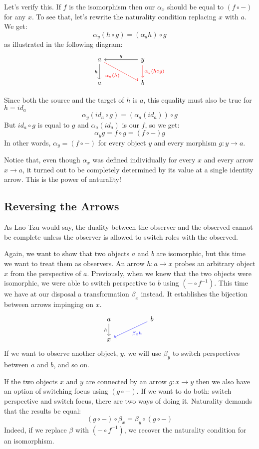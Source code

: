 \documentclass[DaoFP]{subfiles}
\begin{document}
Let's verify this. If $f$ is the isomorphism then our $\alpha_x$ should be equal to  $(f \circ -)$ for any $x$. To see that, let's rewrite the naturality condition replacing $x$ with $a$. We get:
\[\alpha_y(h \circ g) = (\alpha_a h) \circ g \]
as illustrated in the following diagram:
\[
 \begin{tikzcd}
 a
 \arrow[d, "h"']
 \arrow[rrd,  red, "\alpha_a (h)"']
 && y
 \arrow[ll, "g"']
 \arrow[d, red, "\alpha_y (h \circ g)"]
   \\
 a
  && b
 \end{tikzcd}
\]


Since both the source and the target of $h$ is $a$, this equality must also be true for $h = id_a$
\[\alpha_y (id_a \circ g) = (\alpha_a (id_a)) \circ g \]
But $id_a \circ g$ is equal to $g$ and $\alpha_a(id_a)$ is our $f$, so we get:
\[\alpha_y g = f \circ g = (f \circ -) g\]
In other words, $\alpha_y = (f \circ -)$ for every object $y$ and every morphism $g \colon y \to a$.

Notice that, even though $\alpha_x$ was defined individually for every $x$ and every arrow $x \to a$, it turned out to be completely determined by its value at a single identity arrow. This is the power of naturality!
\subsection{Reversing the Arrows}
As Lao Tzu would say, the duality between the observer and the observed cannot be complete unless the observer is allowed to switch roles with the observed. 

Again, we want to show that two objects $a$ and $b$ are isomorphic, but this time we want to treat them as observers. An arrow $h \colon a \to x$ probes an arbitrary object $x$ from the perspective of $a$. Previously, when we knew that the two objects were isomorphic, we were able to switch perspective to $b$ using $(- \circ f^{-1})$. This time we have at our disposal a transformation $\beta_x$ instead. It establishes the bijection between arrows impinging on $x$.
\[
 \begin{tikzcd}
 a
 \arrow[d, "h"']
 && b
 \arrow[lld, blue, "\beta_x h"]
 \\
 x
  \end{tikzcd}
\]
If we want to observe another object, $y$, we will use $\beta_y$ to switch perspectives between $a$ and $b$, and so on. 

If the two objects $x$ and $y$ are connected by an arrow $g \colon x \to y$ then we also have an option of switching focus using $(g \circ -)$. If we want to do both: switch perspective and switch focus, there are two ways of doing it. Naturality demands that the results be equal:
\[ (g \circ -) \circ \beta_x = \beta_y \circ (g \circ -) \]
Indeed, if we replace $\beta$ with $(- \circ f^{-1})$, we recover the naturality condition for an isomorphism. 
\end{document}

